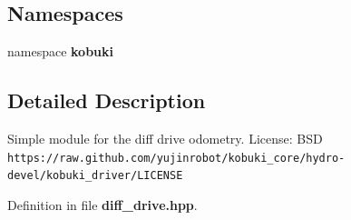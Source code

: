 \subsection*{\-Namespaces}
\begin{DoxyCompactItemize}
\item 
namespace {\bf kobuki}
\end{DoxyCompactItemize}


\subsection{\-Detailed \-Description}
\-Simple module for the diff drive odometry. \-License\-: \-B\-S\-D {\tt https\-://raw.\-github.\-com/yujinrobot/kobuki\-\_\-core/hydro-\/devel/kobuki\-\_\-driver/\-L\-I\-C\-E\-N\-S\-E} 

\-Definition in file {\bf diff\-\_\-drive.\-hpp}.

